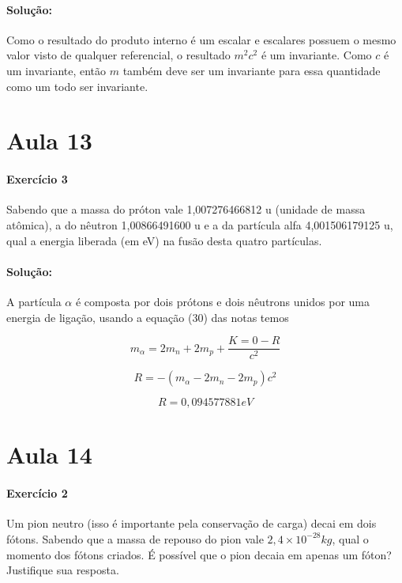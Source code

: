 \documentclass[10pt,a4paper]{article}
\begin{document}
\paragraph{Solução:}  Como o resultado do produto interno é um escalar e escalares possuem o mesmo valor visto de qualquer referencial, o resultado $m^2c^2$ é um invariante. Como $c$ é um invariante, então $m$ também deve ser um invariante para essa quantidade como um todo ser invariante. 

\section*{Aula 13}
\paragraph{Exercício 3} Sabendo que a massa do próton vale 1,007276466812 u (unidade
de massa atômica), a do nêutron 1,00866491600 u e a da partícula alfa 4,001506179125
u, qual a energia liberada (em eV) na fusão desta quatro partículas.

\paragraph{Solução:}
A partícula $ \alpha $ é composta por dois prótons e dois nêutrons unidos por uma energia de ligação, usando a equação (30) das notas temos

\begin{equation}
	m_\alpha = 2m_n + 2m_p + \dfrac{K=0 - R}{c^2}
\end{equation}

\begin{equation}
	 R = - (m_\alpha - 2 m_n - 2m_p)c^2
\end{equation}

$$ R = 0,094577881 eV $$

\section*{Aula 14}

\paragraph{Exercício 2} Um pion neutro (isso é importante pela conservação de carga) decai em dois fótons. Sabendo que a massa de repouso do pion vale $2,4\times 10^{-28}\unit{kg}$, qual o momento dos fótons criados. É possível que o pion decaia em apenas um
fóton? Justifique sua resposta.
\end{document}
